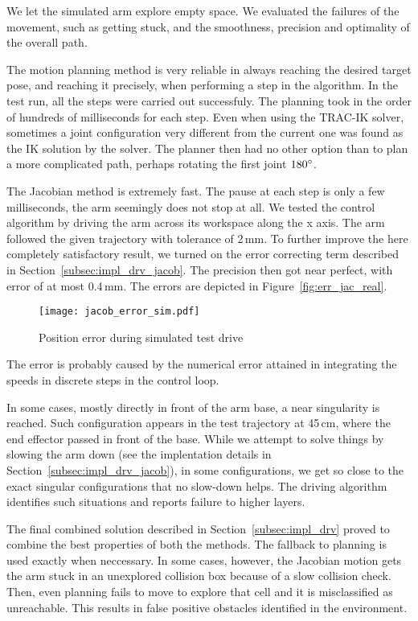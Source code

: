 \documentclass[buriama8_dp.tex]{subfiles}
\begin{document}
We let the simulated arm explore empty space. We evaluated the failures of the movement, such as getting stuck, and the smoothness, precision and optimality of the overall path.

The motion planning method is very reliable in always reaching the desired target pose, and reaching it precisely, when performing a step in the algorithm. In the test run, all the steps were carried out successfuly. The planning took in the order of hundreds of milliseconds for each step. Even when using the TRAC-IK solver, sometimes a joint configuration  very different from the current one was found as the IK solution by the solver. The planner then had no other option than to plan a more complicated path, perhaps rotating the first joint \(180^\circ\).

The Jacobian method is extremely fast. The pause at each step is only a few milliseconds, the arm seemingly does not stop at all. We tested the control algorithm by driving the arm across its workspace along the \m x axis. The arm followed the given trajectory with tolerance of 2\,mm. To further improve the here completely satisfactory result, we turned on the error correcting term described in Section~\ref{subsec:impl_drv_jacob}. The precision then got near perfect, with error of at most 0.4\,mm. The errors are depicted in Figure~\ref{fig:err_jac_real}. 

\begin{figure}[ht]
  \centering
  \texttt{[image: jacob\_error\_sim.pdf]}
  \caption{Position error during simulated test drive}
  \label{fig:err_jac_sim}
\end{figure}

The error is probably caused by the numerical error attained in integrating the speeds in discrete steps in the control loop.

In some cases, mostly directly in front of the arm base, a near singularity is reached. Such configuration appears in the test trajectory at 45\,cm, where the end effector passed in front of the base. While we attempt to solve things by slowing the arm down (see the implentation details in Section~\ref{subsec:impl_drv_jacob}), in some configurations, we get so close to the exact singular configurations that no slow-down helps. The driving algorithm identifies such situations and reports failure to higher layers.

The final combined solution described in Section~\ref{subsec:impl_drv} proved to combine the best properties of both the methods. The fallback to planning is used exactly when neccessary. In some cases, however, the Jacobian motion gets the arm stuck in an unexplored collision box because of a slow collision check. Then, even planning fails to move to explore that cell and it is misclassified as unreachable. This results in false positive obstacles identified in the environment.
\end{document}
